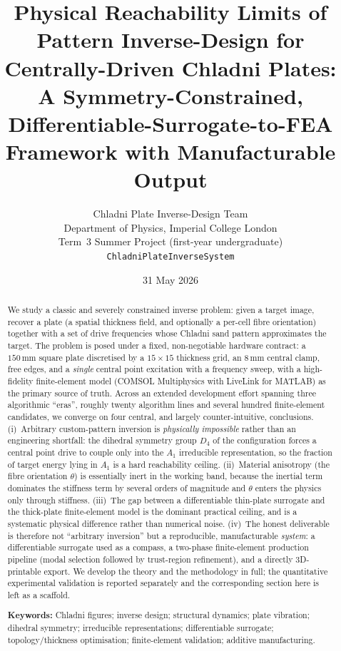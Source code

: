 \documentclass[11pt,a4paper]{article}
\title{\bfseries Physical Reachability Limits of Pattern Inverse-Design for
Centrally-Driven Chladni Plates:\\[2pt]
\large A Symmetry-Constrained, Differentiable-Surrogate-to-FEA Framework with
Manufacturable Output}
\author{%
Chladni Plate Inverse-Design Team\\
\small Department of Physics, Imperial College London\\
\small Term~3 Summer Project (first-year undergraduate)\\
\small \texttt{ChladniPlateInverseSystem}}
\date{31 May 2026}
\newcommand{\Aone}{A_1}
\newcommand{\Dfour}{D_4}
\begin{document}
\maketitle

\begin{abstract}
\noindent
We study a classic and severely constrained inverse problem: given a target
image, recover a plate (a spatial thickness field, and optionally a per-cell
fibre orientation) together with a set of drive frequencies whose Chladni sand
pattern approximates the target. The problem is posed under a fixed,
non-negotiable hardware contract: a $150\,\text{mm}$ square plate discretised by
a $15\times15$ thickness grid, an $8\,\text{mm}$ central clamp, free edges, and a
\emph{single} central point excitation with a frequency sweep, with a
high-fidelity finite-element model (COMSOL Multiphysics with
LiveLink\texttrademark{} for MATLAB) as the primary source of truth. Across an
extended development effort spanning three algorithmic ``eras'', roughly twenty
algorithm lines and several hundred finite-element candidates, we converge on
four central, and largely counter-intuitive, conclusions. (i)~Arbitrary
custom-pattern inversion is \emph{physically impossible} rather than an
engineering shortfall: the dihedral symmetry group $\Dfour$ of the configuration
forces a central point drive to couple only into the $\Aone$ irreducible
representation, so the fraction of target energy lying in $\Aone$ is a hard
reachability ceiling. (ii)~Material anisotropy (the fibre orientation $\theta$)
is essentially inert in the working band, because the inertial term dominates the
stiffness term by several orders of magnitude and $\theta$ enters the physics only
through stiffness. (iii)~The gap between a differentiable thin-plate surrogate and
the thick-plate finite-element model is the dominant practical ceiling, and is a
systematic physical difference rather than numerical noise. (iv)~The honest
deliverable is therefore not ``arbitrary inversion'' but a reproducible,
manufacturable \emph{system}: a differentiable surrogate used as a compass, a
two-phase finite-element production pipeline (modal selection followed by
trust-region refinement), and a directly 3D-printable export. We develop the
theory and the methodology in full; the quantitative experimental validation is
reported separately and the corresponding section here is left as a scaffold.

\medskip
\noindent\textbf{Keywords:} Chladni figures; inverse design; structural dynamics;
plate vibration; dihedral symmetry; irreducible representations; differentiable
surrogate; topology/thickness optimisation; finite-element validation;
additive manufacturing.
\end{abstract}
\end{document}
